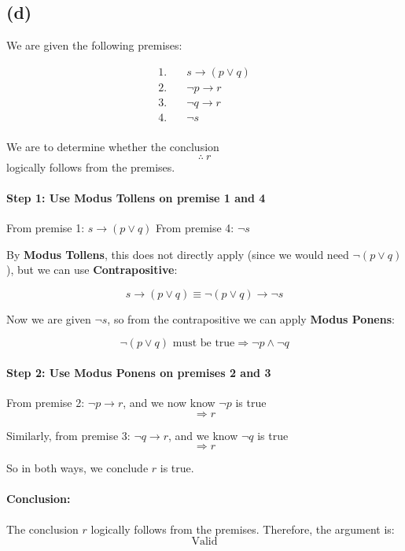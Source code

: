 \documentclass{article}
\begin{document}
\subsection*{(d)}

We are given the following premises:

\begin{align*}
1.\quad & s \to (p \lor q) \\
2.\quad & \neg p \to r \\
3.\quad & \neg q \to r \\
4.\quad & \neg s \\
\end{align*}

We are to determine whether the conclusion
\[
\therefore \ r
\]
logically follows from the premises.

\paragraph{Step 1: Use Modus Tollens on premise 1 and 4}

From premise 1: \( s \to (p \lor q) \)  
From premise 4: \( \neg s \)  

By \textbf{Modus Tollens}, this does not directly apply (since we would need \( \neg(p \lor q) \)), but we can use \textbf{Contrapositive}:

\[
s \to (p \lor q) \equiv \neg(p \lor q) \to \neg s
\]

Now we are given \( \neg s \), so from the contrapositive we can apply \textbf{Modus Ponens}:

\[
\neg(p \lor q) \text{ must be true}
\Rightarrow \neg p \land \neg q
\]

\paragraph{Step 2: Use Modus Ponens on premises 2 and 3}

From premise 2: \( \neg p \to r \), and we now know \( \neg p \) is true  
\[
\Rightarrow r
\]

Similarly, from premise 3: \( \neg q \to r \), and we know \( \neg q \) is true  
\[
\Rightarrow r
\]

So in both ways, we conclude \( r \) is true.

\paragraph{Conclusion:}

The conclusion \( r \) logically follows from the premises.  
Therefore, the argument is:
\[
\boxed{\text{Valid}}
\]
\end{document}
